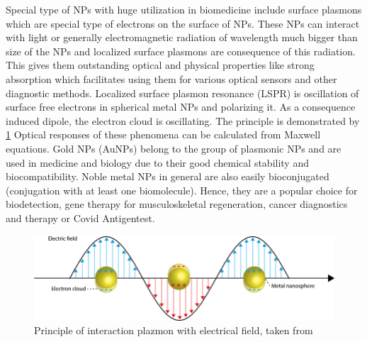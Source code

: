 \documentclass[a4paper,12pt]{article}   %
\numberwithin{equation}{section}        %
\begin{document}
        Special type of NPs with huge utilization in biomedicine include surface plasmons which are special type of electrons on the surface of NPs.
        These NPs can interact with light or generally electromagnetic radiation of wavelength much bigger than size of the NPs and localized surface
        plasmons are consequence of this radiation. This gives them outstanding optical and physical properties like strong absorption which facilitates
        using them for various optical sensors and other diagnostic methods. Localized surface plasmon resonance (LSPR) is oscillation of surface free
        electrons in spherical metal NPs and polarizing it. As a consequence induced dipole, the electron cloud is oscillating. The principle is demonstrated
        by \ref{fig:LSPR} Optical responses of these phenomena can be calculated from Maxwell equations. Gold NPs (AuNPs) belong to the group of plasmonic NPs
        and are used in medicine and biology due to their good chemical stability and biocompatibility. Noble metal NPs in general are also easily bioconjugated
        (conjugation with at least one biomolecule). Hence, they are a popular choice for biodetection, gene therapy for musculoskeletal regeneration,
        cancer diagnostics and therapy or Covid Antigentest. 

        \begin{figure}
            \includegraphics[width=\linewidth]{LSPR.png}
            \caption{Principle of interaction plazmon with electrical field, taken from}
            \label{fig:LSPR}
        \end{figure}
\end{document}
